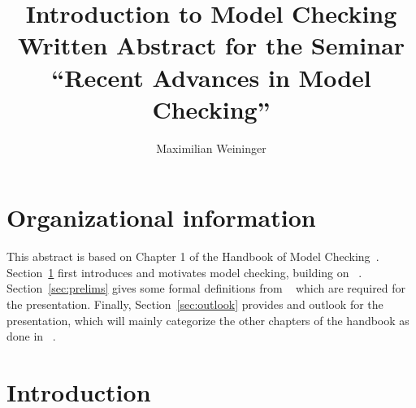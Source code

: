 \documentclass[11pt]{article}
\title{Introduction to Model Checking\\\small Written Abstract for the Seminar ``Recent Advances in Model Checking''}
\author{Maximilian Weininger}
\date{}
\begin{document}

\maketitle	

\vspace{-2.5em}
\section*{Organizational information}

This abstract is based on Chapter 1 of the Handbook of Model Checking~\cite{handbook}.
Section~\ref{sec:intro} first introduces and motivates model checking, building on ~\cite[Chapter 1.1]{handbook}.
Section~\ref{sec:prelims} gives some formal definitions from ~\cite[Chapter 1.2.1 and 1.2.4]{handbook} which are required for the presentation.
Finally, Section~\ref{sec:outlook} provides and outlook for the presentation, which will mainly categorize the other chapters of the handbook as done in ~\cite[Chapter 1.3]{handbook}.

\section{Introduction}\label{sec:intro}
\end{document}
